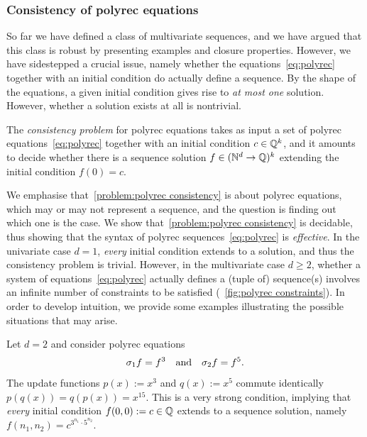 %

\subsubsection{Consistency of polyrec equations}
\label{sec:consistency of polyrec equations}

So far we have defined a class of multivariate sequences, and we have argued that this class is robust
by presenting examples and closure properties.
%
However, we have sidestepped a crucial issue,
namely whether the equations~\cref{eq:polyrec} together with an initial condition
do actually define a sequence.
%
By the shape of the equations,
a given initial condition gives rise to \emph{at most one} solution.
%
However, whether a solution exists at all is nontrivial.
%
\begin{problem}
    \label{problem:polyrec consistency}
    The \emph{consistency problem} for polyrec equations
    takes as input a set of polyrec equations~\cref{eq:polyrec}
    together with an initial condition $c \in \mathbb Q^k$,
    and it amounts to decide whether there is a sequence solution $f \in (\mathbb N^d \to \mathbb Q)^k$ 
    extending the initial condition $f(0) = c$.
\end{problem}
%
\noindent
We emphasise that~\cref{problem:polyrec consistency} is about polyrec equations,
which may or may not represent a sequence,
and the question is finding out which one is the case.
%
We show that~\cref{problem:polyrec consistency} is decidable,
thus showing that the syntax of polyrec sequences~\cref{eq:polyrec} is \emph{effective}.
%
In the univariate case $d = 1$,
\emph{every} initial condition extends to a solution,
and thus the consistency problem is trivial.
%
However, in the multivariate case $d \geq 2$,
whether a system of equations~\cref{eq:polyrec}
actually defines a (tuple of) sequence(s)
involves an infinite number of constraints to be satisfied\-
(\cf~\cref{fig:polyrec constraints}).
%
In order to develop intuition, we provide some examples
illustrating the possible situations that may arise.

\begin{example}
    Let $d = 2$ and consider polyrec equations
    \begin{align*}
        \sigma_{1} f = f^3
            \quad\text{and}\quad
                \sigma_{2} f = f^5.
    \end{align*}
    The update functions $p(x) := x^3$ and $q(x) := x^5$
    commute identically $p(q(x)) = q(p(x)) = x^{15}$.
    This is a very strong condition,
    implying that \emph{every} initial condition $f(0, 0) := c \in \mathbb Q$
    extends to a sequence solution,
    namely $f(n_1, n_2) = c^{3^{n_1} \cdot 5^{n_2}}$.
\end{example}

